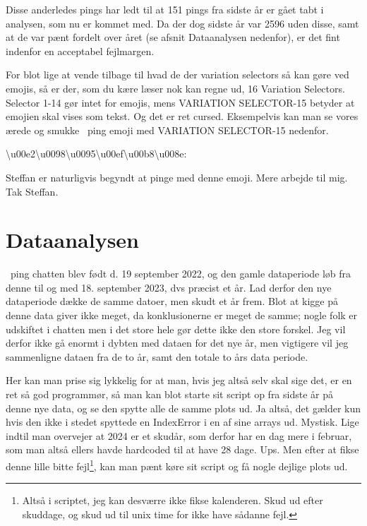 \documentclass{article}
\newlength\myheight
\newlength\mydepth
\newcommand*\inlinegraphics[1]{%
  \settototalheight\myheight{Xygp}%
  \settodepth\mydepth{Xygp}%
  \raisebox{-\mydepth}{\texttt{[image: \#1]}}%
}
\newcommand{\coffee}[0]{\inlinegraphics{coffee.png}}
\newcommand{\textcoffee}[0]{\inlinegraphics{text_coffee.png}}
\begin{document}
Disse anderledes pings har ledt til at 151 pings fra sidste år er gået tabt i analysen, som nu er kommet med. Da der dog sidste år var 2596 uden disse, samt at de var pænt fordelt over året (se afsnit Dataanalysen nedenfor), er det fint indenfor en acceptabel fejlmargen.

For blot lige at vende tilbage til hvad de der variation selectors så kan gøre ved emojis, så er der, som du kære læser nok kan regne ud, 16 Variation Selectors. Selector 1-14 gør intet for emojis, mens VARIATION SELECTOR-15 betyder at emojien skal vises som tekst. Og det er ret cursed. Eksempelvis kan man se vores ærede og smukke \coffee\ ping emoji med VARIATION SELECTOR-15 nedenfor.
\begin{center}
	\textbackslash u00e2\textbackslash u0098\textbackslash u0095\textbackslash u00ef\textbackslash u00b8\textbackslash u008e: \textcoffee
\end{center}
Steffan er naturligvis begyndt at pinge med denne emoji. Mere arbejde til mig. Tak Steffan.


\section*{Dataanalysen}

\coffee\ ping chatten blev født d. 19 september 2022, og den gamle dataperiode løb fra denne til og med 18. september 2023, dvs præcist et år. Lad derfor den nye dataperiode dække de samme datoer, men skudt et år frem. Blot at kigge på denne data giver ikke meget, da konklusionerne er meget de samme; nogle folk er udskiftet i chatten men i det store hele gør dette ikke den store forskel. Jeg vil derfor ikke gå enormt i dybten med dataen for det nye år, men vigtigere vil jeg sammenligne dataen fra de to år, samt den totale to års data periode.

Her kan man prise sig lykkelig for at man, hvis jeg altså selv skal sige det, er en ret så god programmør, så man kan blot starte sit script op fra sidste år på denne nye data, og se den spytte alle de samme plots ud. Ja altså, det gælder kun hvis den ikke i stedet spyttede en IndexError i en af sine arrays ud. Mystisk. Lige indtil man overvejer at 2024 er et skudår, som derfor har en dag mere i februar, som man altså ellers havde hardcoded til at have 28 dage. Ups.
Men efter at fikse denne lille bitte fejl\footnote{Altså i scriptet, jeg kan desværre ikke fikse kalenderen. Skud ud efter skuddage, og skud ud til unix time for ikke have sådanne fejl.}, kan man pænt køre sit script og få nogle dejlige plots ud.
\end{document}

